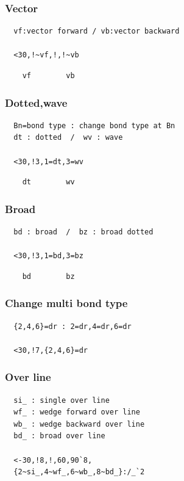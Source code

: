\documentclass[a4paper]{article}
\makeatletter
\def\MCFstructure{\hspace{5mm}{\@strufont\char\fontnum}\advance\fontnum\@ne\relax}%
\makeatother
\begin{document}
\subsubsection{Vector}
\begin{verbatim}
  vf:vector forward / vb:vector backward

  <30,!~vf,!,!~vb
\end{verbatim}
\MCFstructure
\vspace{-3mm}%
\begin{verbatim}
    vf        vb
\end{verbatim}
\subsubsection{Dotted,wave}
\begin{verbatim}
  Bn=bond type : change bond type at Bn
  dt : dotted  /  wv : wave

  <30,!3,1=dt,3=wv
\end{verbatim}
\MCFstructure
\vspace{-3mm}%
\begin{verbatim}
    dt        wv
\end{verbatim}
\subsubsection{Broad}
\begin{verbatim}
  bd : broad  /  bz : broad dotted 

  <30,!3,1=bd,3=bz
\end{verbatim}
\MCFstructure
\vspace{-3mm}%
\begin{verbatim}
    bd        bz
\end{verbatim}
\subsubsection{Change multi bond type}
\begin{verbatim}
  {2,4,6}=dr : 2=dr,4=dr,6=dr

  <30,!7,{2,4,6}=dr
\end{verbatim}
\MCFstructure
\subsubsection{Over line}
\begin{verbatim}
  si_ : single over line 
  wf_ : wedge forward over line 
  wb_ : wedge backward over line 
  bd_ : broad over line 

  <-30,!8,!,60,90`8,
  {2~si_,4~wf_,6~wb_,8~bd_}:/_`2
\end{verbatim}
\MCFstructure
\end{document}
